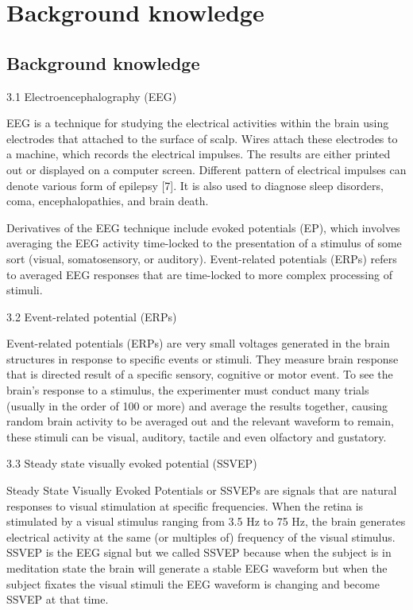 \chapter{Background knowledge}

\label{ch:Background knowledge}

\setlength{\parindent}{4em}
\setlength{\parskip}{1em}
\renewcommand{\baselinestretch}{1.5}

\section{Background knowledge}

\hspace{1.5cm} 3.1 Electroencephalography (EEG)

EEG is a technique for studying the electrical activities within the brain using electrodes that attached to the surface of scalp. Wires attach these electrodes to a machine, which records the electrical impulses. The results are either printed out or displayed on a computer screen. Different pattern of electrical impulses can denote various form of epilepsy [7]. It is also used to diagnose sleep disorders, coma, encephalopathies, and brain death.\par
Derivatives of the EEG technique include evoked potentials (EP), which involves averaging the EEG activity time-locked to the presentation of a stimulus of some sort (visual, somatosensory, or auditory). Event-related potentials (ERPs) refers to averaged EEG responses that are time-locked to more complex processing of stimuli.

3.2 Event-related potential (ERPs)

Event-related potentials (ERPs) are very small voltages generated in the brain structures in response to specific events or stimuli. They measure brain response that is directed result of a specific sensory, cognitive or motor event. To see the brain's response to a stimulus, the experimenter must conduct many trials (usually in the order of 100 or more) and average the results together, causing random brain activity to be averaged out and the relevant waveform to remain, these stimuli can be visual, auditory, tactile and even olfactory and gustatory.\par

3.3 Steady state visually evoked potential (SSVEP)

Steady State Visually Evoked Potentials or SSVEPs are signals that are natural responses to visual stimulation at specific frequencies. When the retina is stimulated by a visual stimulus ranging from 3.5 Hz to 75 Hz, the brain generates electrical activity at the same (or multiples of) frequency of the visual stimulus. SSVEP is the EEG signal but we called SSVEP because when the subject is in meditation state the brain will generate a stable EEG waveform but when the subject fixates the visual stimuli the EEG waveform is changing and become SSVEP at that time.\par

